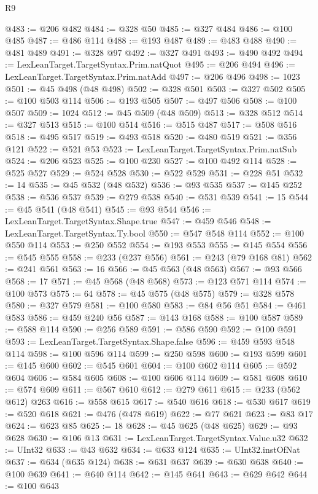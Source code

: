 \begin{lexlean}{R9}
\begin{coremodule}
{{{{{{{{{{{{{{{{{{{{{{{{{{{{{{{{{{{{{{{{{{{{{{{{{{{{{{{{{{{{{{{{{{{{{{{{{{{{{{{{{{{{{{{{{{{{{{{{{{{{{{{{{{{{@483 := @206 @482
@484 := @328 @50
@485 := @327 @484
@486 := @100 @485
@487 := @486 @114
@488 := @193 @487
@489 := @483 @488
@490 := @481 @489
@491 := @328 @97
@492 := @327 @491
@493 := @490 @492
@494 := LexLeanTarget.TargetSyntax.Prim.natQuot
@495 := @206 @494
@496 := LexLeanTarget.TargetSyntax.Prim.natAdd
@497 := @206 @496
@498 := 1023
@501 := @45 @498 (@48 @498)
@502 := @328 @501
@503 := @327 @502
@505 := @100 @503 @114
@506 := @193 @505
@507 := @497 @506
@508 := @100 @507
@509 := 1024
@512 := @45 @509 (@48 @509)
@513 := @328 @512
@514 := @327 @513
@515 := @100 @514
@516 := @515 @487
@517 := @508 @516
@518 := @495 @517
@519 := @493 @518
@520 := @480 @519
@521 := @356 @121
@522 := @521 @53
@523 := LexLeanTarget.TargetSyntax.Prim.natSub
@524 := @206 @523
@525 := @100 @230
@527 := @100 @492 @114
@528 := @525 @527
@529 := @524 @528
@530 := @522 @529
@531 := @228 @51
@532 := 14
@535 := @45 @532 (@48 @532)
@536 := @93 @535
@537 := @145 @252
@538 := @536 @537
@539 := @279 @538
@540 := @531 @539
@541 := 15
@544 := @45 @541 (@48 @541)
@545 := @93 @544
@546 := LexLeanTarget.TargetSyntax.Shape.true
@547 := @459 @546
@548 := LexLeanTarget.TargetSyntax.Ty.bool
@550 := @547 @548 @114
@552 := @100 @550 @114
@553 := @250 @552
@554 := @193 @553
@555 := @145 @554
@556 := @545 @555
@558 := @233 (@237 @556)
@561 := @243 (@79 @168 @81)
@562 := @241 @561
@563 := 16
@566 := @45 @563 (@48 @563)
@567 := @93 @566
@568 := 17
@571 := @45 @568 (@48 @568)
@573 := @123 @571 @114
@574 := @100 @573
@575 := 64
@578 := @45 @575 (@48 @575)
@579 := @328 @578
@580 := @327 @579
@581 := @100 @580
@583 := @84 @56 @51
@584 := @461 @583
@586 := @459 @240 @56
@587 := @143 @168
@588 := @100 @587
@589 := @588 @114
@590 := @256 @589
@591 := @586 @590
@592 := @100 @591
@593 := LexLeanTarget.TargetSyntax.Shape.false
@596 := @459 @593 @548 @114
@598 := @100 @596 @114
@599 := @250 @598
@600 := @193 @599
@601 := @145 @600
@602 := @545 @601
@604 := @100 @602 @114
@605 := @592 @604
@606 := @584 @605
@608 := @100 @606 @114
@609 := @581 @608
@610 := @574 @609
@611 := @567 @610
@612 := @279 @611
@615 := @233 (@562 @612) @263
@616 := @558 @615
@617 := @540 @616
@618 := @530 @617
@619 := @520 @618
@621 := @476 (@478 @619)
@622 := @77 @621
@623 := @83 @17
@624 := @623 @85
@625 := 18
@628 := @45 @625 (@48 @625)
@629 := @93 @628
@630 := @106 @13
@631 := LexLeanTarget.TargetSyntax.Value.u32
@632 := UInt32
@633 := @43 @632
@634 := @633 @124
@635 := UInt32.instOfNat
@637 := @634 (@635 @124)
@638 := @631 @637
@639 := @630 @638
@640 := @100 @639
@641 := @640 @114
@642 := @145 @641
@643 := @629 @642
@644 := @100 @643
}}}}}}}}}}}}}}}}}}}}}}}}}}}}}}}}}}}}}}}}}}}}}}}}}}}}}}}}}}}}}}}}}}}}}}}}}}}}}}}}}}}}}}}}}}}}}}}}}}}}}}}}}}}}
\end{coremodule}
\end{lexlean}
